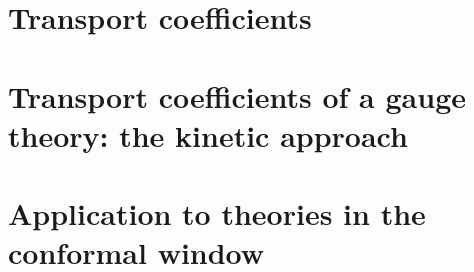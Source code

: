 
\section{Transport coefficients}



\section{Transport coefficients of a gauge theory: the kinetic approach}



\section{Application to theories in the conformal window}

